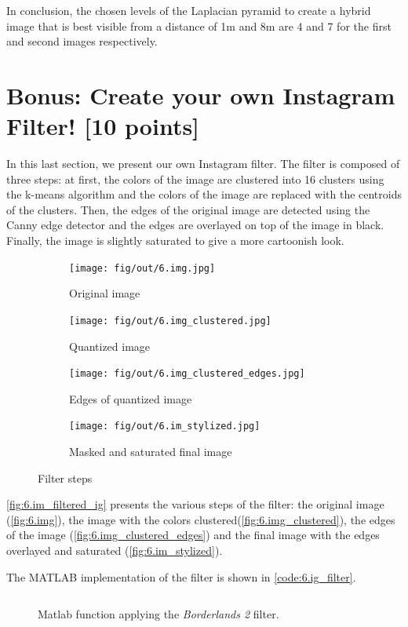 \documentclass[tikz,14pt,fleqn]{article}
\begin{document}
In conclusion, the chosen levels of the Laplacian pyramid to create a hybrid image that is best visible from a distance of 1m and 8m are 4 and 7 for the first and second images respectively.


\section{Bonus: Create your own Instagram Filter! [10 points]}


In this last section, we present our own Instagram filter. 
The filter is composed of three steps: at first, the colors of the image are clustered into 16 clusters using the k-means algorithm and the colors of the image are replaced with the centroids of the clusters. Then, the edges of the original image are detected using the Canny edge detector and the edges are overlayed on top of the image in black. Finally, the image is slightly saturated to give a more cartoonish look.

\begin{figure}[H]
    \centering
    \begin{subfigure}[t]{.245\linewidth}
        \texttt{[image: fig/out/6.img.jpg]}
        \caption{Original image}
        \label{fig:6.img}
    \end{subfigure}
    \begin{subfigure}[t]{.245\linewidth}
        \texttt{[image: fig/out/6.img\_clustered.jpg]}
        \caption{Quantized image}
        \label{fig:6.img_clustered}
    \end{subfigure}
    \begin{subfigure}[t]{.245\linewidth}
        \texttt{[image: fig/out/6.img\_clustered\_edges.jpg]}
        \caption{Edges of quantized image}
        \label{fig:6.img_clustered_edges}
    \end{subfigure}
    \begin{subfigure}[t]{.245\linewidth}
        \texttt{[image: fig/out/6.im\_stylized.jpg]}
        \caption{Masked and saturated final image}
        \label{fig:6.im_stylized}
    \end{subfigure}
    \caption{Filter steps}
    \label{fig:6.im_filtered_ig}
\end{figure}

\autoref{fig:6.im_filtered_ig} presents the various steps of the filter: the original image (\autoref{fig:6.img}), the image with the colors clustered(\autoref{fig:6.img_clustered}), the edges of the image (\autoref{fig:6.img_clustered_edges}) and the final image with the edges overlayed and saturated (\autoref{fig:6.im_stylized}).

The MATLAB implementation of the filter is shown in \autoref{code:6.ig_filter}.


\begin{figure}[H]
    \vspace*{-0.2cm}
    \inputminted[firstline=17, frame=lines, framesep=2mm, fontsize=\small ]{matlab}{../src/ex6.m}
    \vspace*{-0.5cm}
    \caption{Matlab function applying the \textit{Borderlands 2} filter.}
    \label{code:6.ig_filter}
\end{figure}
\end{document}
